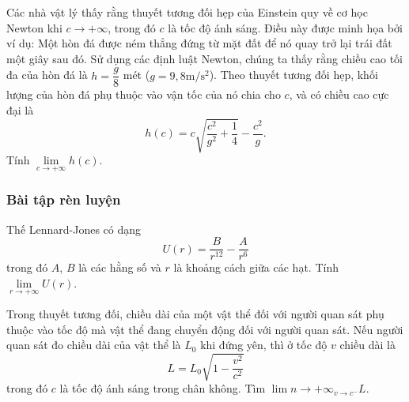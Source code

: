 \begin{vd}%
Các nhà vật lý  thấy rằng thuyết tương đối hẹp của Einstein quy về cơ học Newton khi $c \rightarrow +\infty$, trong đó $c$ là tốc độ ánh sáng. Điều này được minh họa bởi ví dụ: Một hòn đá được ném thẳng đứng từ mặt đất để nó quay trở lại trái đất một giây sau đó. Sử dụng các định luật Newton, chúng ta thấy rằng chiều cao tối đa của hòn đá là $h=\dfrac{g}{8}$ mét ($g = 9{,}8 \mathrm{m/ s ^2}$). Theo thuyết tương đối hẹp, khối lượng của hòn đá phụ thuộc vào vận tốc của nó chia cho $c$, và có chiều cao cực đại là 
\[
h(c)=c \sqrt{\dfrac{c^2}{g^2}+\dfrac{1}{4}}- \dfrac{c^2}{g}.
\]
Tính $\lim\limits _{c \rightarrow +\infty} h(c)$.
\end{vd}



\subsubsection{Bài tập rèn luyện}
\begin{bt}%
Thế Lennard-Jones có dạng $$U(r) = \dfrac{B}{r^{12}} - \dfrac{A}{r^6}$$ trong đó $A$, $B$ là các hằng số và $r$ là khoảng cách giữa các hạt. 
Tính $\lim\limits _{r \rightarrow +\infty} U(r)$.
\end{bt}

\begin{bt}%
Trong thuyết tương đối, chiều dài của một vật thể đối với người quan sát phụ thuộc vào tốc độ mà vật thể đang chuyển động đối với người quan sát. Nếu người quan sát đo chiều dài của vật thể là $L_0$ khi đứng yên, thì ở tốc độ $v$ chiều dài  là
$$
L=L_0 \sqrt{1-\frac{v^2}{c^2}}
$$
trong đó $c$ là tốc độ ánh sáng trong chân không. Tìm $\displaystyle \lim \limits{n \to +\infty}_{v \rightarrow c^{-}} L$. 
\end{bt}

